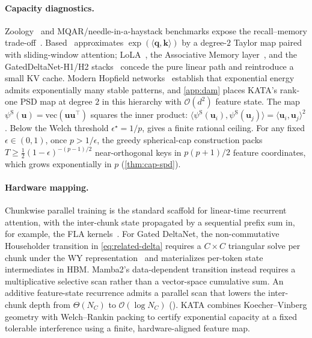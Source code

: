 \documentclass{article}
\newcommand{\1}{\bm{1}}
\newcommand{\lrangle}[1]{\langle#1\rangle}
\def\eps{{\epsilon}}
\def\vk{{\bm{k}}}
\def\vq{{\bm{q}}}
\def\vu{{\bm{u}}}
\def\gO{{\mathcal{O}}}
\newcommand{\seql}{T}
\theoremstyle{definition}
\begin{document}
\paragraph{Capacity diagnostics.} Zoology~\citep{arora23zoology} and MQAR/needle-in-a-haystack benchmarks expose the recall--memory
trade-off~\citep{jelassi24repeat,du25mom}. Based~\citep{arora24based} approximates
$\exp(\lrangle{\vq,\vk})$ by a degree-$2$ Taylor map paired with sliding-window attention;
LoLA~\citep{mcdermott25lola}, the Associative Memory layer~\citep{krotov25mam}, and the
GatedDeltaNet-H1/H2 stacks~\citep{yang25gateddeltanet} concede the pure linear path and reintroduce
a small KV cache. Modern Hopfield
networks~\citep{krotov16dense,demircigil17model,ramsauer21hopfield,zhong25transformersdam}
establish that exponential energy admits exponentially many stable patterns, and \cref{app:dam}
places KATA's rank-one PSD map at degree $2$ in this hierarchy with $\gO(d^2)$ feature state.
The map $\psi^{\mathrm S}(\vu)=\mathrm{vec}(\vu\vu^\top)$ squares the inner product:
$\lrangle{\psi^{\mathrm S}(\vu_i),\psi^{\mathrm S}(\vu_j)}=\lrangle{\vu_i,\vu_j}^2$.
Below the Welch threshold $\eps^\star=1/p$,  gives a finite rational ceiling.
For any fixed $\eps\in(0,1)$, once $p>1/\eps$, the greedy spherical-cap construction packs
$\seql\ge\tfrac12(1-\eps)^{-(p-1)/2}$ near-orthogonal keys in
$p(p+1)/2$ feature coordinates, which grows exponentially in $p$ (\cref{thm:cap-spd}).
\paragraph{Hardware mapping.} Chunkwise parallel training is the standard scaffold for linear-time
recurrent attention, with the inter-chunk state propagated by a sequential prefix sum in, for
example, the FLA kernels~\citep{yang24fla}. For Gated DeltaNet, the non-commutative Householder
transition in \cref{eq:related-delta} requires a $C\!\times\!C$ triangular solve per chunk under the
WY representation~\citep{schreiber89compactwy} and materializes per-token state intermediates in HBM.
Mamba2's data-dependent transition instead requires a multiplicative selective scan rather than a
vector-space cumulative sum. An additive feature-state recurrence admits a parallel scan that lowers the
inter-chunk depth from $\Theta(N_C)$ to $\gO(\log N_C)$ (). KATA combines
Koecher--Vinberg geometry with Welch--Rankin packing to certify exponential capacity at a fixed
tolerable interference using a finite, hardware-aligned feature map.
\end{document}

